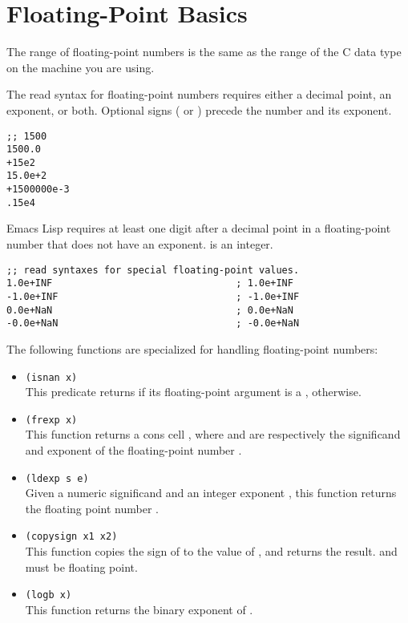 \section{Floating-Point Basics}
\label{sec:float-point-basics}

The range of floating-point numbers is the same as the range of the C data type  on the machine you are using.

The read syntax for floating-point numbers requires either a decimal point, an exponent, or both.
Optional signs (\argument{+} or \argument{-}) precede the number and its exponent.
\begin{lstlisting}
;; 1500
1500.0
+15e2
15.0e+2
+1500000e-3
.15e4
\end{lstlisting}
Emacs Lisp requires at least one digit after a decimal point in a floating-point number that does not have an exponent.
 is an integer.

\begin{lstlisting}
;; read syntaxes for special floating-point values.
1.0e+INF                                ; 1.0e+INF
-1.0e+INF                               ; -1.0e+INF
0.0e+NaN                                ; 0.0e+NaN
-0.0e+NaN                               ; -0.0e+NaN
\end{lstlisting}

The following functions are specialized for handling floating-point numbers:
\begin{itemize}[itemsep=10pt]
\item \lstinline|(isnan x)|\\
  This predicate returns  if its floating-point argument is a ,  otherwise.
\item \lstinline|(frexp x)|\\
  This function returns a cons cell , where  and  are respectively the significand and exponent of the floating-point number .
\item \lstinline|(ldexp s e)|\\
  Given a numeric significand  and an integer exponent , this function returns the floating point number .
\item \lstinline|(copysign x1 x2)|\\
  This function copies the sign of  to the value of , and returns the result.
   and  must be floating point.
\item \lstinline|(logb x)|\\
  This function returns the binary exponent of .
\end{itemize}

